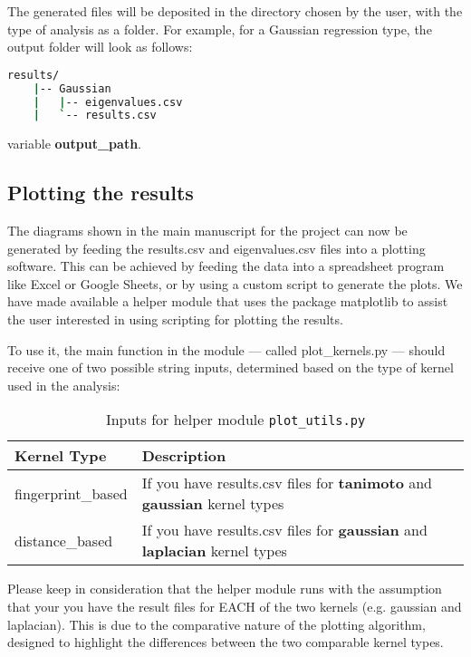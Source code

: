 \documentclass{article}
\begin{document}
The generated files will be deposited in the directory chosen by the user, with the type of analysis as a folder. For example,
for a Gaussian regression type, the output folder will look as follows:
\begin{lstlisting}[language=bash]
    results/
    |-- Gaussian
    |   |-- eigenvalues.csv
    |   `-- results.csv
\end{lstlisting}
variable \textbf{output\_path}.

\subsection{Plotting the results}

The diagrams shown in the main manuscript for the project can now be generated by feeding the results.csv and eigenvalues.csv files into a plotting software.
This can be achieved by feeding the data into a spreadsheet program like Excel or Google Sheets, or by using 
a custom script to generate the plots. We have made available a helper module that uses the package matplotlib to 
assist the user interested in using scripting for plotting the results.

To use it, the main function in the module — called plot\_kernels.py — should receive one of two possible string 
inputs, determined based on the type of kernel used in the analysis:

\begin{table}[h]
    \centering
    \begin{tabular}{|l|p{10cm}|}
    \hline
    \textbf{Kernel Type} & \textbf{Description} \\ \hline
    fingerprint\_based & If you have results.csv files for \textbf{tanimoto} and \textbf{gaussian} kernel types \\ \hline
    distance\_based & If you have results.csv files for \textbf{gaussian} and \textbf{laplacian} kernel types \\ \hline
    \end{tabular}
    \caption{Inputs for helper module \texttt{plot\_utils.py}}
    \label{tab:kernel_validity}
\end{table}

Please keep in consideration that the helper module runs with the assumption that your 
you have the result files for EACH of the two kernels (e.g. gaussian and laplacian). This is 
due to the comparative nature of the plotting algorithm, designed to 
highlight the differences between the two comparable kernel types.
\end{document}
